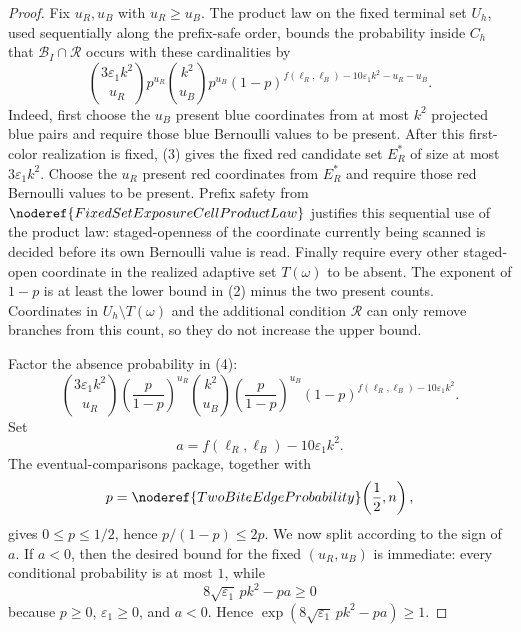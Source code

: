 \begin{proof}
Fix \(u_R,u_B\) with \(u_R\ge u_B\).  The product law on the fixed terminal
set \(U_h\), used sequentially along the prefix-safe order, bounds the
probability inside \(C_h\) that \(\mathcal B_I\cap\mathcal R\) occurs with
these cardinalities by
\[
\binom{3\varepsilon_1k^2}{u_R}p^{u_R}
\binom{k^2}{u_B}p^{u_B}
(1-p)^{f(\ell_R,\ell_B)-10\varepsilon_1k^2-u_R-u_B}. \tag{4}
\]
Indeed, first choose the \(u_B\) present blue coordinates from at most \(k^2\)
projected blue pairs and require those blue Bernoulli values to be present.
After this first-color realization is fixed, (3) gives the fixed red
candidate set \(E_R^\ast\) of size at most \(3\varepsilon_1k^2\).  Choose the
\(u_R\) present red coordinates from \(E_R^\ast\) and require those red
Bernoulli values to be present.  Prefix safety from
\(\noderef{FixedSetExposureCellProductLaw}\) justifies this sequential use of
the product law: staged-openness of the coordinate currently being scanned is
decided before its own Bernoulli value is read.  Finally require every other
staged-open coordinate in the realized adaptive set \(T(\omega)\) to be
absent.  The exponent of \(1-p\) is at least the lower bound in (2) minus the
two present counts.  Coordinates in \(U_h\setminus T(\omega)\) and the
additional condition \(\mathcal R\) can only remove branches from this count,
so they do not increase the upper bound.

Factor the absence probability in (4):
\[
\binom{3\varepsilon_1k^2}{u_R}
\left(\frac{p}{1-p}\right)^{u_R}
\binom{k^2}{u_B}
\left(\frac{p}{1-p}\right)^{u_B}
(1-p)^{f(\ell_R,\ell_B)-10\varepsilon_1k^2}. \tag{5}
\]
Set
\[
a=f(\ell_R,\ell_B)-10\varepsilon_1k^2.
\]
The eventual-comparisons package, together with
\[
p=\noderef{TwoBiteEdgeProbability}\!\left(\frac12,n\right),
\]
gives \(0\le p\le1/2\), hence \(p/(1-p)\le2p\).  We now split according to
the sign of \(a\).  If \(a<0\), then the desired bound for the fixed
\((u_R,u_B)\) is immediate: every conditional probability is at most \(1\),
while
\[
8\sqrt{\varepsilon_1}\,pk^2-pa\ge0
\]
because \(p\ge0\), \(\varepsilon_1\ge0\), and \(a<0\).  Hence
\(\exp(8\sqrt{\varepsilon_1}\,pk^2-pa)\ge1\).


\end{proof}
